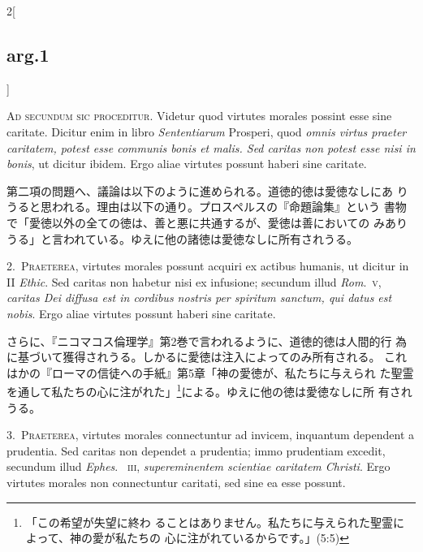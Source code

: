 \documentclass[paper=a4paper,fontsize=10pt,jafontsize=9pt,titlepage]{jlreq}
\begin{document}
\begin{paracol}{2}[\subsection{arg.1}]

{\scshape Ad secundum sic proceditur}. Videtur quod virtutes morales
 possint esse sine caritate. Dicitur enim in libro {\itshape
 Sententiarum} Prosperi, quod {\itshape omnis virtus praeter
 caritatem, potest esse communis bonis et malis. Sed caritas non
 potest esse nisi in bonis}, ut dicitur ibidem. Ergo aliae virtutes
 possunt haberi sine caritate.

\switchcolumn

第二項の問題へ、議論は以下のように進められる。道徳的徳は愛徳なしにあ
 りうると思われる。理由は以下の通り。プロスペルスの『命題論集』という
 書物で「愛徳以外の全ての徳は、善と悪に共通するが、愛徳は善においての
 みありうる」と言われている。ゆえに他の諸徳は愛徳なしに所有されうる。


2.~{\scshape Praeterea}, virtutes morales possunt acquiri ex actibus
humanis, ut dicitur in II {\itshape Ethic}. Sed caritas non habetur
nisi ex infusione; secundum illud {\itshape Rom}.~{\scshape v},
{\itshape caritas Dei diffusa est in cordibus nostris per spiritum
sanctum, qui datus est nobis}. Ergo aliae virtutes possunt haberi sine
caritate.

\switchcolumn

さらに、『ニコマコス倫理学』第2巻で言われるように、道徳的徳は人間的行
 為に基づいて獲得されうる。しかるに愛徳は注入によってのみ所有される。
 これはかの『ローマの信徒への手紙』第5章「神の愛徳が、私たちに与えられ
 た聖霊を通して私たちの心に注がれた」\footnote{「この希望が失望に終わ
 ることはありません。私たちに与えられた聖霊によって、神の愛が私たちの
 心に注がれているからです。」(5:5)}による。ゆえに他の徳は愛徳なしに所
 有されうる。


3.~{\scshape Praeterea}, virtutes morales connectuntur ad invicem,
inquantum dependent a prudentia. Sed caritas non dependet a prudentia;
immo prudentiam excedit, secundum illud {\itshape Ephes}.~{\scshape
iii}, {\itshape supereminentem scientiae caritatem Christi}. Ergo
virtutes morales non connectuntur caritati, sed sine ea esse possunt.


\end{paracol}
\end{document}
